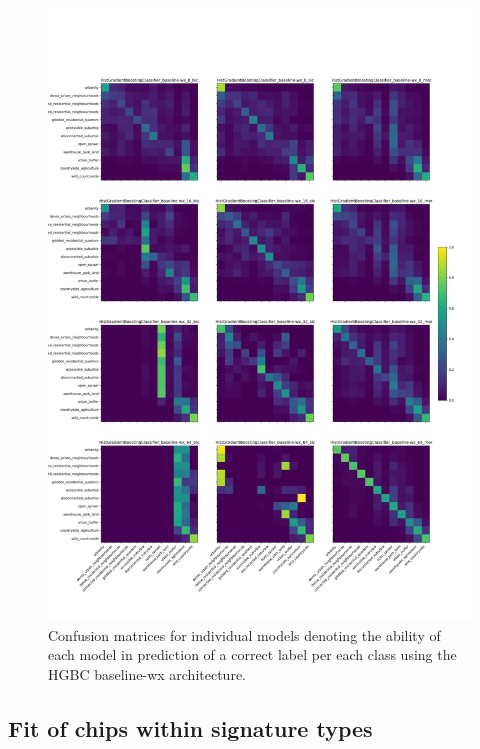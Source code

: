 \begin{figure}
    \centering
    \includegraphics[width=.9\linewidth]{fig/HistGradientBoostingClassifier_baseline-wx_cm.png}
    \caption{\footnotesize Confusion matrices for individual models denoting
    the ability of each model in prediction of a correct label per each class
    using the HGBC baseline-wx architecture.}
    \label{fig:HistGradientBoostingClassifier_baseline-wx}
\end{figure}


\subsection{Fit of chips within signature types}

